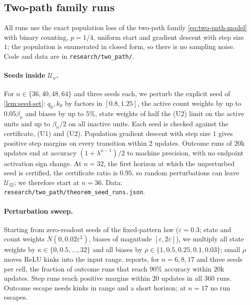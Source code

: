 \subsection{Two-path family runs}
\label{app:two-path-experiments}
All runs use the exact population loss of the two-path family \cref{eq:two-path-model} with binary counting, $p=1/4$,
uniform start and gradient descent with step size $1$; the population is enumerated in closed form, so there is no sampling
noise. Code and data are in \nolinkurl{research/two_path/}.

\paragraph{Seeds inside $\mathcal U_n$.} For $n\in\{36,40,48,64\}$ and three seeds each, we perturb the explicit seed of
\cref{lem:seed-set}: $q_0,k_0$ by factors in $[0.8,1.25]$, the active count weights by up to $0.05\beta_n$ and biases by
up to $5\%$, state weights of half the (U2) limit on the active units and up to $\beta_n/2$ on all inactive units.
Each seed is checked against the certificate, (U1) and (U2). Population gradient descent with step size $1$ gives
positive step margins on every transition within $2$ updates. Outcome runs of $20$k updates end at accuracy
$(1+\lambda^{n-1})/2$ to machine precision, with no endpoint activation sign change. At $n=32$, the first horizon at
which the unperturbed seed is certified, the certificate ratio is $0.95$, so random perturbations can leave $\mathcal U_{32}$;
we therefore start at $n=36$. Data: \nolinkurl{research/two_path/theorem_seed_runs.json}.

\paragraph{Perturbation sweep.} Starting from zero-readout seeds of the fixed-pattern law ($\varepsilon=0.3$; state and count weights $N(0,0.02\varepsilon^2)$, biases of magnitude $[\varepsilon,2\varepsilon]$), we multiply all state weights by
$\kappa\in\{0,0.5,\ldots,32\}$ and all biases by $\rho\in\{1,0.5,0.25,0.1,0.03\}$; small $\rho$ moves ReLU kinks into
the input range.  reports, for $n=6,8,17$ and three seeds per cell, the fraction of
outcome runs that reach $90\%$ accuracy within $20$k updates. Step runs reach positive margins within $20$
updates in all $360$ runs. Outcome escape needs kinks in range and a short horizon; at $n=17$ no run escapes.

